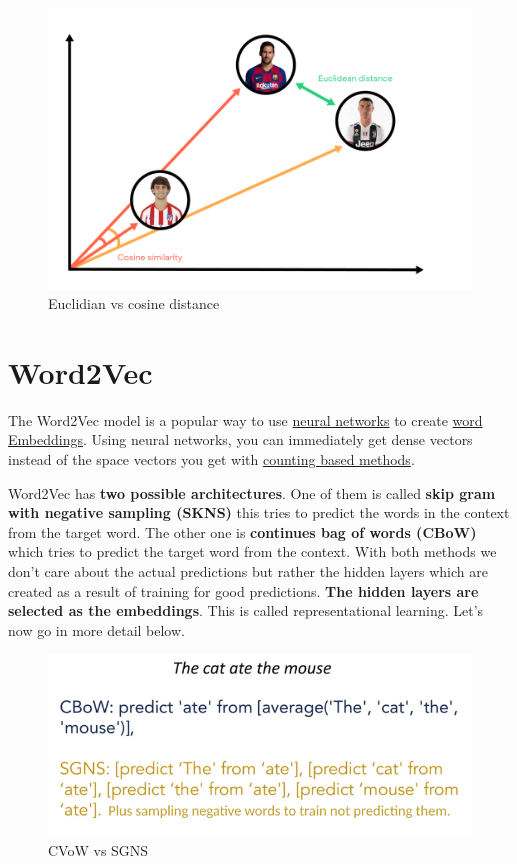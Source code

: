 \documentclass[
  11pt,
  british,
]{article}
\begin{document}
\begin{figure}
\centering
\includegraphics{Pasted_image_20220606220215.png}
\caption{Euclidian vs cosine distance}
\end{figure}

\hypertarget{word2vec}{%
\section{Word2Vec}\label{word2vec}}

The Word2Vec model is a popular way to use
\href{../Prediction/Feed\%20forward\%20neural\%20networks\%20(FFNN).md}{neural
networks} to create \href{Embeddings.md}{word Embeddings}. Using neural
networks, you can immediately get dense vectors instead of the space
vectors you get with \href{Co-occurrence.md}{counting based methods}.

Word2Vec has \textbf{two possible architectures}. One of them is called
\textbf{skip gram with negative sampling (SKNS)} this tries to predict
the words in the context from the target word. The other one is
\textbf{continues bag of words (CBoW)} which tries to predict the target
word from the context. With both methods we don't care about the actual
predictions but rather the hidden layers which are created as a result
of training for good predictions. \textbf{The hidden layers are selected
as the embeddings}. This is called representational learning. Let's now
go in more detail below.

\begin{figure}
\centering
\includegraphics{Pasted_image_20220604014153.png}
\caption{CVoW vs SGNS}
\end{figure}
\end{document}
